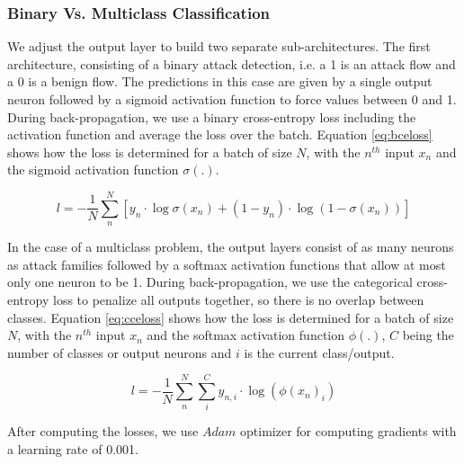 \documentclass[conference]{IEEEtran}
\begin{document}
\subsubsection{Binary Vs. Multiclass Classification}
We adjust the output layer to build two separate sub-architectures. The first architecture, consisting of a binary attack detection, i.e. a 1 is an attack flow and a 0 is a benign flow. The predictions in this case are given by a single output neuron followed by a sigmoid activation function to force values between 0 and 1. During back-propagation, we use a binary cross-entropy loss including the activation function and average the loss over the batch. Equation \ref{eq:bceloss} shows how the loss is determined for a batch of size $N$, with the $n^{th}$ input $x_{n}$ and the sigmoid activation function  $\sigma(.)$.

\begin{equation}
\label{eq:bceloss}
l = - \frac{1}{N} \sum_{n}^{N} [y_n \cdot \log \sigma (x_{n}) + (1 - y_n) \cdot \log (1 - \sigma (x_{n}))]
\end{equation}

In the case of a multiclass problem, the output layers consist of as many neurons as attack families followed by a softmax activation functions that allow at most only one neuron to be 1. During back-propagation, we use the categorical cross-entropy loss to penalize all outputs together, so there is no overlap between classes. Equation \ref{eq:cceloss} shows how the loss is determined for a batch of size $N$, with the $n^{th}$ input $x_{n}$ and the softmax activation function  $\phi(.)$, $C$ being the number of classes or output neurons and $i$ is the current class/output.

\begin{equation}
\label{eq:cceloss}
l = - \frac{1}{N} \sum_{n}^{N} \sum_{i}^{C} y_{n,i} \cdot \log (\phi(x_{n})_{i})
\end{equation}

After computing the losses, we use $Adam$ optimizer \cite{kingma_adam_2017} for computing gradients with a learning rate of 0.001.
\end{document}

